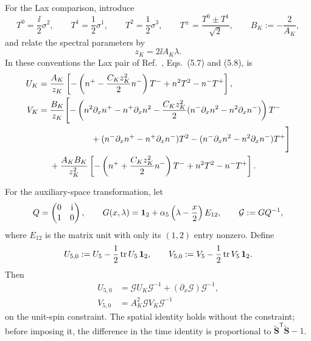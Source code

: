 For the Lax comparison, introduce
\begin{equation}
T^0=\frac{\ii}{2}\sigma^2,
\qquad
T^1=\frac12\sigma^1,
\qquad
T^2=\frac12\sigma^3,
\qquad
T^{\pm}=\frac{T^0\pm T^1}{\sqrt2},
\qquad
B_K:=-\frac{2}{A_K},
\label{eq:class5-known-generators}
\end{equation}
and relate the spectral parameters by
\begin{equation}
z_K=2\ii A_K\lambda.
\label{eq:class5-known-spectral-dictionary}
\end{equation}
In these conventions the Lax pair of
Ref.~\cite{KameyamaYoshida2014}, Eqs.~(5.7) and (5.8), is
\begin{align}
U_K
={}&\frac{A_K}{z_K}
\left[
-\left(n^+-\frac{C_Kz_K^2}{2}n^-\right)T^-
+n^2T^2-n^-T^+
\right],
\label{eq:class5-known-UK}\\
V_K
={}&\frac{B_K}{z_K}\Biggl[
-\left(
 n^2\partial_xn^+-n^+\partial_xn^2
 -\frac{C_Kz_K^2}{2}
 (n^-\partial_xn^2-n^2\partial_xn^-)
\right)T^-
\nonumber\\
&\hspace{17mm}
+(n^-\partial_xn^+-n^+\partial_xn^-)T^2
-(n^-\partial_xn^2-n^2\partial_xn^-)T^+
\Biggr]
\nonumber\\
&+\frac{A_KB_K}{z_K^2}
\left[
-\left(n^++\frac{C_Kz_K^2}{2}n^-\right)T^-
+n^2T^2-n^-T^+
\right].
\label{eq:class5-known-VK}
\end{align}

For the auxiliary-space transformation, let
\begin{equation}
Q=\begin{pmatrix}0&\mathrm{i}\\1&0\end{pmatrix},
\qquad
G(x,\lambda)
=\mathbf{1}_2+\alpha_5\left(\lambda-\frac{x}{2}\right)E_{12},
\qquad
\mathcal G:=GQ^{-1},
\label{eq:class5-known-gauge}
\end{equation}
where $E_{12}$ is the matrix unit with only its $(1,2)$ entry nonzero.  Define
\begin{equation}
U_{5,0}:=U_5-\frac12\operatorname{tr} U_5\,\mathbf{1}_2,
\qquad
V_{5,0}:=V_5-\frac12\operatorname{tr} V_5\,\mathbf{1}_2.
\label{eq:class5-known-traceless}
\end{equation}
Then
\begin{align}
U_{5,0}
&=\mathcal G U_K\mathcal G^{-1}
 +(\partial_x\mathcal G)\mathcal G^{-1},
\label{eq:class5-known-U-map}\\
V_{5,0}
&=A_K^2\mathcal G V_K\mathcal G^{-1}
\label{eq:class5-known-V-map}
\end{align}
on the unit-spin constraint.  The spatial identity holds without the
constraint; before imposing it, the difference in the time identity is
proportional to
$\widetilde{\boldsymbol S}^{\mathsf T}\widetilde{\boldsymbol S}-1$.

